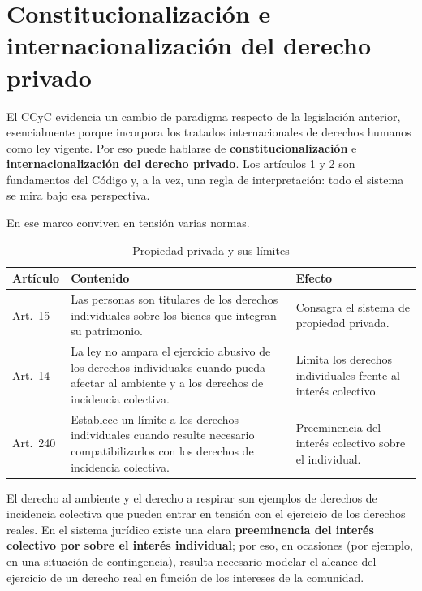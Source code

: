 \documentclass[12pt,oneside]{book}
\begin{document}
\section{Constitucionalización e internacionalización del derecho privado}

El CCyC evidencia un cambio de paradigma respecto de la legislación anterior, esencialmente porque incorpora los tratados internacionales de derechos humanos como ley vigente. Por eso puede hablarse de \textbf{constitucionalización} e \textbf{internacionalización del derecho privado}. Los artículos 1 y 2 son fundamentos del Código y, a la vez, una regla de interpretación: todo el sistema se mira bajo esa perspectiva.

En ese marco conviven en tensión varias normas.

\begin{table}[H]
\centering
\small
\begin{tabularx}{\textwidth}{>{\raggedright\arraybackslash}p{}>{\raggedright\arraybackslash}X>{\raggedright\arraybackslash}p{}}
\toprule
\textbf{Artículo} & \textbf{Contenido} & \textbf{Efecto} \\
\midrule
Art.~15 & Las personas son titulares de los derechos individuales sobre los bienes que integran su patrimonio. & Consagra el sistema de propiedad privada. \\
Art.~14 & La ley no ampara el ejercicio abusivo de los derechos individuales cuando pueda afectar al ambiente y a los derechos de incidencia colectiva. & Limita los derechos individuales frente al interés colectivo. \\
Art.~240 & Establece un límite a los derechos individuales cuando resulte necesario compatibilizarlos con los derechos de incidencia colectiva. & Preeminencia del interés colectivo sobre el individual. \\
\bottomrule
\end{tabularx}
\caption{Propiedad privada y sus límites}
\end{table}

El derecho al ambiente y el derecho a respirar son ejemplos de derechos de incidencia colectiva que pueden entrar en tensión con el ejercicio de los derechos reales. En el sistema jurídico existe una clara \textbf{preeminencia del interés colectivo por sobre el interés individual}; por eso, en ocasiones (por ejemplo, en una situación de contingencia), resulta necesario modelar el alcance del ejercicio de un derecho real en función de los intereses de la comunidad.
\end{document}
